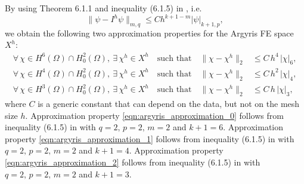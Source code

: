 By using Theorem 6.1.1 and inequality (6.1.5) in \cite{Ciarlet}, i.e.
\begin{equation}
  \|\psi - I^h \psi\|_{m,q} \le C h^{k+1-m} |\psi|_{k+1,p},
  \label{eqn:ArgyrisBound}
\end{equation}
we obtain the following two approximation properties for the Argyris FE space
$X^h$:
\begin{align}
  \forall \, \chi \in H^6(\Omega) \cap H^2_0(\Omega), \ \exists \, \chi^h \in X^h
  \quad \text{such that} \quad
  \| \chi - \chi^h \|_2
  &\leq C \, h^4 \, | \chi |_6 ,
  \label{eqn:argyris_approximation_0} \\[0.2cm]
  \forall \, \chi \in H^4(\Omega) \cap H^2_0(\Omega), \ \exists \, \chi^h \in X^h
  \quad \text{such that} \quad
  \| \chi - \chi^h \|_2
  &\leq C \, h^2 \, | \chi |_4 ,
  \label{eqn:argyris_approximation_1} \\[0.2cm]
  \forall \, \chi \in H^3(\Omega) \cap H^2_0(\Omega), \ \exists \, \chi^h \in X^h
  \quad \text{such that} \quad
  \| \chi - \chi^h \|_2
  &\leq C \, h \, | \chi |_3 ,
  \label{eqn:argyris_approximation_2}
\end{align}
where $C$ is a generic constant that can depend on the data, but not on the
mesh size $h$.  Approximation property \eqref{eqn:argyris_approximation_0}
follows from inequality (6.1.5) in \cite{Ciarlet} with $q = 2, \, p = 2, \, m =
2$ and $k+1 = 6$. Approximation property \eqref{eqn:argyris_approximation_1}
follows from inequality (6.1.5) in \cite{Ciarlet} with $q = 2, \, p = 2, \, m =
2$ and $k+1 = 4$. Approximation property \eqref{eqn:argyris_approximation_2}
follows from inequality (6.1.5) in \cite{Ciarlet} with $q = 2, \, p = 2, \, m =
2$ and $k+1 = 3$.

